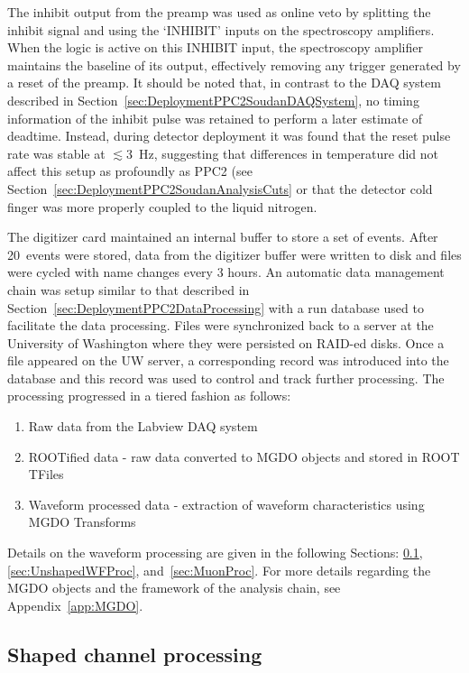 The inhibit output from the preamp was used as online veto by splitting the inhibit signal and using the `INHIBIT' inputs on the spectroscopy amplifiers.  When the logic is active on this INHIBIT input, the spectroscopy amplifier maintains the baseline of its output, effectively removing any trigger generated by a reset of the preamp.  It should be noted that, in contrast to the DAQ system described in Section~\ref{sec:DeploymentPPC2SoudanDAQSystem}, no timing information of the inhibit pulse was retained to perform a later estimate of deadtime.  Instead, during detector deployment it was found that the reset pulse rate was stable at $\lesssim$3~Hz, suggesting that differences in temperature did not affect this setup as profoundly as PPC2 (see Section~\ref{sec:DeploymentPPC2SoudanAnalysisCuts} or that the detector cold finger was more properly coupled to the liquid nitrogen.  %

	The digitizer card maintained an internal buffer to store a set of events.  After 20~events were stored, data from the digitizer buffer were written to disk and files were cycled with name changes every 3 hours.  An automatic data management chain was setup similar to that described in Section~\ref{sec:DeploymentPPC2DataProcessing} with a run database used to facilitate the data processing.  Files were synchronized back to a server at the University of Washington where they were persisted on RAID-ed disks.  Once a file appeared on the UW server, a corresponding record was introduced into the database and this record was used to control and track further processing.  The processing progressed in a tiered fashion as follows:
		\begin{enumerate}
			\item[Tier 0:]  Raw data from the Labview DAQ system
			\item[Tier 1:]  ROOTified data - raw data converted to MGDO objects and stored in ROOT TFiles
			\item[Tier 2:]  Waveform processed data - extraction of waveform characteristics using MGDO Transforms
		\end{enumerate}
Details on the waveform processing are given in the following Sections: \ref{sec:BegeShapedProc}, \ref{sec:UnshapedWFProc}, and~\ref{sec:MuonProc}.  For more details regarding the MGDO objects and the framework of the analysis chain, see Appendix~\ref{app:MGDO}.
	
		\subsection{Shaped channel processing}
		\label{sec:BegeShapedProc}

